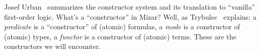 Josef Urban~\cite{urban2003translating} summarizes the constructor
system and its translation to ``vanilla'' first-order logic. What's a
``constructor'' in Mizar? Well, as Trybulec~\cite{trybulec1993some}
explains: a \emph{predicate} is a ``constructor'' of (atomic) formulas,
a \emph{mode} is a constructor of (atomic) types, a \emph{functor} is a
constructor of (atomic) terms. These are the constructors we will
encounter.


